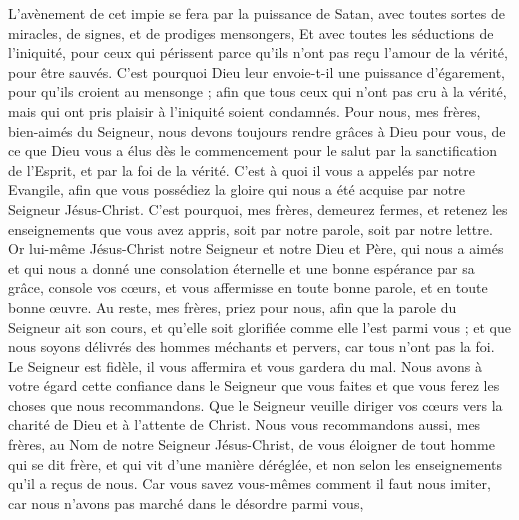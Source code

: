 \begin{multicols}{2}
L'avènement de cet impie se fera par la puissance de Satan, avec toutes sortes de miracles, de signes, et de prodiges mensongers,
Et avec toutes les séductions de l'iniquité, pour ceux qui périssent parce qu'ils n'ont pas reçu l'amour de la vérité, pour être sauvés.
C'est pourquoi Dieu leur envoie-t-il une puissance d'égarement, pour qu'ils croient au mensonge ;
afin que tous ceux qui n'ont pas cru à la vérité, mais qui ont pris plaisir à l'iniquité soient condamnés.
Pour nous, mes frères, bien-aimés du Seigneur, nous devons toujours rendre grâces à Dieu pour vous, de ce que Dieu vous a élus dès le commencement pour le salut par la sanctification de l'Esprit, et par la foi de la vérité.
C'est à quoi il vous a appelés par notre Evangile, afin que vous possédiez la gloire qui nous a été acquise par notre Seigneur Jésus-Christ.
C'est pourquoi, mes frères, demeurez fermes, et retenez les enseignements que vous avez appris, soit par notre parole, soit par notre lettre.
Or lui-même Jésus-Christ notre Seigneur et notre Dieu et Père, qui nous a aimés et qui nous a donné une consolation éternelle et une bonne espérance par sa grâce,
console vos cœurs, et vous affermisse en toute bonne parole, et en toute bonne œuvre.
\VerseOne{}Au reste, mes frères, priez pour nous, afin que la parole du Seigneur ait son cours, et qu'elle soit glorifiée comme elle l'est parmi vous ; 
et que nous soyons délivrés des hommes méchants et pervers, car tous n'ont pas la foi.
Le Seigneur est fidèle, il vous affermira et vous gardera du mal.
Nous avons à votre égard cette confiance dans le Seigneur que vous faites et que vous ferez les choses que nous recommandons.
Que le Seigneur veuille diriger vos cœurs vers la charité de Dieu et à l'attente de Christ.
Nous vous recommandons aussi, mes frères, au Nom de notre Seigneur Jésus-Christ, de vous éloigner de tout homme qui se dit frère, et qui vit d'une manière déréglée, et non selon les enseignements qu'il a reçus de nous.
Car vous savez vous-mêmes comment il faut nous imiter, car nous n'avons pas marché dans le désordre parmi vous,

\end{multicols}
